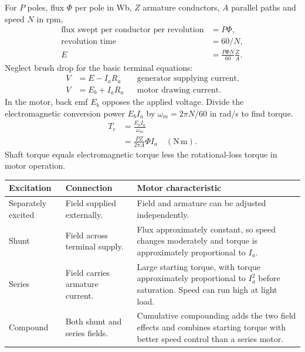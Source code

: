\documentclass[12pt,a4paper]{article}
\begin{document}
For \(P\) poles, flux \(\Phi\) per pole in Wb, \(Z\) armature conductors, \(A\) parallel paths and speed \(N\) in rpm,
\[
\begin{aligned}
\text{flux swept per conductor per revolution}&=P\Phi,\\
\text{revolution time}&=60/N,\\
E&=\frac{P\Phi N}{60}\frac{Z}{A}.
\end{aligned}
\]
Neglect brush drop for the basic terminal equations:
\[
\begin{aligned}
V&=E-I_aR_a &&\text{generator supplying current},\\
V&=E_b+I_aR_a &&\text{motor drawing current}.
\end{aligned}
\]
In the motor, back emf \(E_b\) opposes the applied voltage. Divide the electromagnetic conversion power \(E_b I_a\) by \(\omega_m=2\pi N/60\) in rad/s to find torque.
\[
\begin{aligned}
T_e&=\frac{E_b I_a}{\omega_m}\\
   &=\frac{PZ}{2\pi A}\Phi I_a \quad(\mathrm{N\,m}).
\end{aligned}
\]
Shaft torque equals electromagnetic torque less the rotational-loss torque in motor operation.

\par\vspace{6pt}\noindent
\begin{tabularx}{\linewidth}{|B{3.4cm}|Y|Y|}\hline
Excitation & \textbf{Connection} & \textbf{Motor characteristic} \\ \hline
Separately excited & Field supplied externally. & Field and armature can be adjusted independently. \\ \hline
Shunt & Field across terminal supply. & Flux approximately constant, so speed changes moderately and torque is approximately proportional to \(I_a\). \\ \hline
Series & Field carries armature current. & Large starting torque, with torque approximately proportional to \(I_a^2\) before saturation. Speed can run high at light load. \\ \hline
Compound & Both shunt and series fields. & Cumulative compounding adds the two field effects and combines starting torque with better speed control than a series motor. \\ \hline
\end{tabularx}
\end{document}
